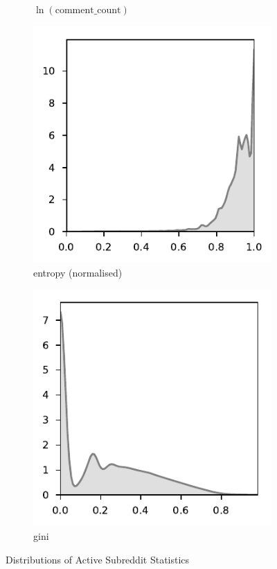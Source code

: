 \documentclass{article}
\begin{document}
\begin{figure}
\begin{subfigure}[b]{0.49\textwidth}
         \caption{$\ln(\text{comment\_count})$}
         \label{hist:comment}
     \end{subfigure}
     \hfill
     \begin{subfigure}[b]{0.49\textwidth}
         \centering
         \includegraphics[width=\textwidth]{kde-entropy_norm.pdf}
         \caption{entropy (normalised)}
         \label{hist:entropy}
     \end{subfigure}
     \hfill
     \begin{subfigure}[b]{0.49\textwidth}
         \centering
         \includegraphics[width=\textwidth]{kde-gini.pdf}
         \caption{gini}
         \label{hist:gini}
     \end{subfigure}
        \caption{Distributions of Active Subreddit Statistics}
        \label{hists}
\end{figure}
\end{document}
